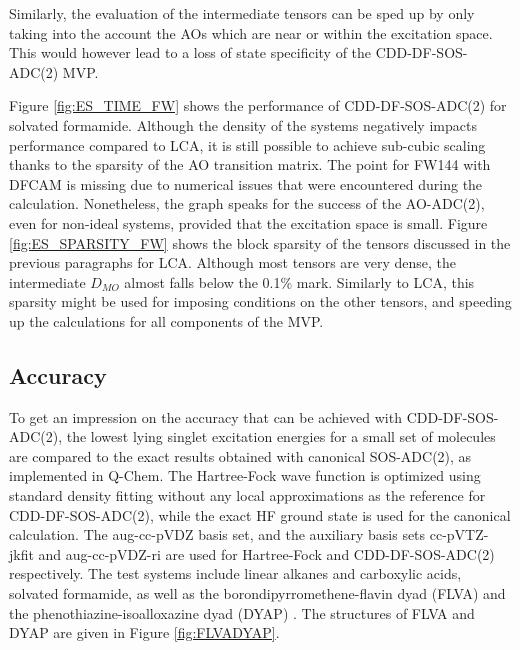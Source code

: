 

Similarly, the evaluation of the intermediate tensors can be sped up by only taking into the account the AOs which are near or within the excitation space. This would however lead to a loss of state specificity of the CDD-DF-SOS-ADC(2) MVP. 

Figure \ref{fig:ES_TIME_FW} shows the performance of CDD-DF-SOS-ADC(2) for solvated formamide. Although the density of the systems negatively impacts performance compared to LCA, it is still possible to achieve sub-cubic scaling thanks to the sparsity of the AO transition matrix. The point for FW144 with DFCAM is missing due to numerical issues that were encountered during the calculation. Nonetheless, the graph speaks for the success of the AO-ADC(2), even for non-ideal systems, provided that the excitation space is small. Figure \ref{fig:ES_SPARSITY_FW} shows the block sparsity of the tensors discussed in the previous paragraphs for LCA. Although most tensors are very dense, the intermediate $D_{MO}$ almost falls below the 0.1\% mark. Similarly to LCA, this sparsity might be used for imposing conditions on the other tensors, and speeding up the calculations for all components of the MVP. 

\subsection{Accuracy}

To get an impression on the accuracy that can be achieved with CDD-DF-SOS-ADC(2), the lowest lying singlet excitation energies for a small set of molecules are compared to the exact results obtained with canonical SOS-ADC(2), as implemented in Q-Chem. The Hartree-Fock wave function is optimized using standard density fitting without any local approximations as the reference for CDD-DF-SOS-ADC(2), while the exact HF ground state is used for the canonical calculation. The aug-cc-pVDZ basis set, and the auxiliary basis sets cc-pVTZ-jkfit and aug-cc-pVDZ-ri are used for Hartree-Fock and CDD-DF-SOS-ADC(2) respectively. The test systems include linear alkanes and carboxylic acids, solvated formamide, as well as the borondipyrromethene-flavin dyad (FLVA) \cite{Kat2007} and the phenothiazine-isoalloxazine dyad (DYAP) \cite{Cra2002}. The structures of FLVA and DYAP are given in Figure \ref{fig:FLVADYAP}.


